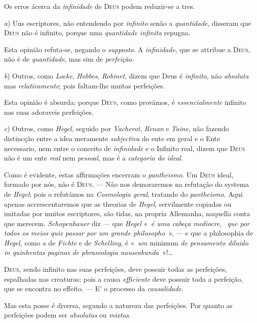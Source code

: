 {\asterisco Os erros ácerca da \emph{infinidade} de \textsc{Deus} podem reduzir-se a tres.

\emph{a}) Uns escriptores, não entendendo por \emph{infinito} senão a \emph{quantidade},
disseram que \textsc{Deus} não é infinito, porque uma \emph{quantidade infinita} repugna.

Esta opinião refuta-se, negando o \emph{supposto}. A \emph{infinidade}, que se attribue a
\textsc{Deus}, não é de \emph{quantidade}, mas sim de \emph{perfeição}.

\emph{b}) Outros, como \emph{Locke}, \emph{Hobbes}, \emph{Robinet}, dizem que Deus é
\emph{infinito}, não \emph{absoluta} mas \emph{relativamente}; pois faltam-lhe muitas
perfeições.

Esta opinião é absurda; porque \textsc{Deus}, como provámos, é \emph{essencialmente}
infinito nas suas adoraveis perfeições.

\emph{c}) Outros, como \emph{Hegel}, seguido por \emph{Vacherot}, \emph{Renan} e
\emph{Taine}, não fazendo distincção entre a idea meramente \emph{subjectiva} do ente em
geral e o Ente necessario, nem entre o conceito de \emph{infinidade} e o Infinito real,
dizem que \textsc{Deus} não é um ente \emph{real} nem \emph{pessoal}, mas é a
\emph{categoria do ideal}.

Como é evidente, estas affirmações encerram o \emph{pantheismo}. Um \textsc{Deus} ideal,
formado por nós, não é \textsc{Deus}. --- Não nos demoraremos na refutação do systema de
\emph{Hegel}; pois o refutámos na \emph{Cosmologia geral}, tratando do
\emph{pantheismo}. Aqui apenas accrescentaremos que as theorias de \emph{Hegel},
servilmente copiadas ou imitadas por muitos escriptores, são tidas, na propria Allemanha,
naquella conta que merecem. \emph{Schopenhauer} diz --- que \emph{Hegel} «~\emph{é uma
cabeça mediocre}, ~\emph{que por todos os meios quiz passar por um grande
philosopho}~», --- e que a philosophia de \emph{Hegel}, como a de \emph{Fichte} e de
\emph{Schelling}, é «~\emph{um} minimum \emph{de pensamento diluido in quinhentas paginas
de phraseologia nauseabunda}~»!\dots

\textsc{Deus}, sendo infinito nas suas perfeições, deve possuir todas as perfeições,
espalhadas nas creaturas; pois a causa \emph{efficiente} deve possuir toda a perfeição,
que se encontra no effeito. --- E' o processo da \emph{causalidade}.

Mas esta posse é diversa, segundo a natureza das perfeições. Por quanto as perfeições
podem ser \emph{absolutas} ou \emph{mixtas}.

}
